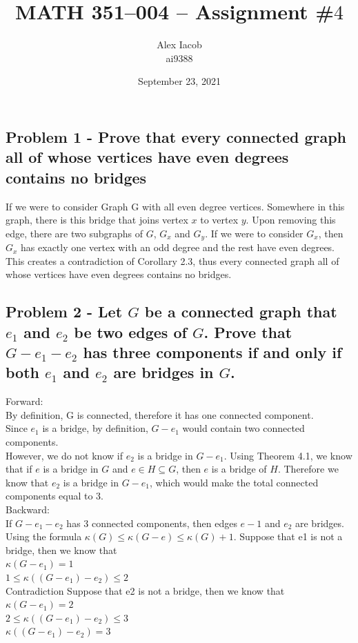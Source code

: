 \documentclass[10pt,a4paper]{article}
\title{MATH 351--004 -- Assignment \#$4$\\
}
\author{Alex Iacob\\
ai9388}
\date{September 23, 2021}
\begin{document}
\maketitle

\subsection*{Problem 1 - Prove that every connected graph all of whose vertices have even degrees contains no bridges}
If we were to consider Graph G with all even degree vertices.
Somewhere in this graph, there is this bridge that joins vertex $x$ to vertex $y$. Upon removing this edge, there are two subgraphs of $G$, $G_{x}$ and $G_{y}$. If we were to consider $G_{x}$, then $G_{x}$ has exactly one vertex with an odd degree and the rest have even degrees. This creates a contradiction of Corollary 2.3, thus every connected graph all of whose vertices have even degrees contains no bridges.


\subsection*{Problem 2 - Let $G$ be a connected graph that $e_{1}$ and $e_{2}$ be two edges of $G$. Prove that 
$G - e_{1} - e_{2}$ has three components if and only if both $e_{1}$ and $e_{2}$ are bridges in $G$.}

Forward:\\
By definition, G is connected, therefore it has one connected component. \\
Since $e_{1}$ is a bridge, by definition, $G - e_{1}$ would contain two connected components.\\
However, we do not know if $e_{2}$ is a bridge in $G - e_{1}$. Using Theorem 4.1, we know that if $e$ is a bridge in $G$ and $e \in H \subseteq G$, then $e$ is a bridge of $H$. Therefore we know that $e_{2}$ is a bridge in $G - e_{1}$, which would make the total connected components equal to 3.\\
Backward:\\
If $G - e_{1} - e_{2}$ has 3 connected components, then edges $e-{1}$ and $e_{2}$ are bridges. \\
Using the formula $\kappa(G) \leq \kappa(G - e) \leq \kappa(G) + 1$.
Suppose that e1 is not a bridge, then we know that\\
$\kappa(G - e_{1}) = 1$\\
$1 \leq \kappa((G - e_{1}) - e_{2}) \leq 2$\\ Contradiction
Suppose that e2 is not a bridge, then we know that\\
$\kappa(G - e_{1}) = 2$\\
$2 \leq \kappa((G - e_{1}) - e_{2}) \leq 3$\\ 
$\kappa((G - e_{1}) - e_{2}) = 3$
\end{document}
